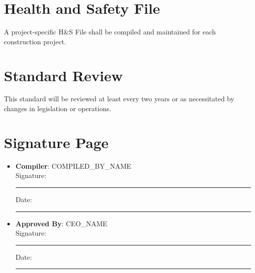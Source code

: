 \documentclass[11pt]{article}
\newcommand{\compilerName}{{{COMPILED_BY_NAME}}}
\begin{document}
\section{Health and Safety File}
A project-specific H\&S File shall be compiled and maintained for each construction project.

\section{Standard Review}
This standard will be reviewed at least every two years or as necessitated by changes in legislation or operations.

\section{Signature Page}
\begin{itemize}
  \item \textbf{Compiler}: \compilerName \\
    Signature: \rule{5cm}{0.4pt} \quad Date: \rule{3cm}{0.4pt}
  \item \textbf{Approved By}: {{CEO_NAME}} \\
    Signature: \rule{5cm}{0.4pt} \quad Date: \rule{3cm}{0.4pt}
\end{itemize}
\end{document}
